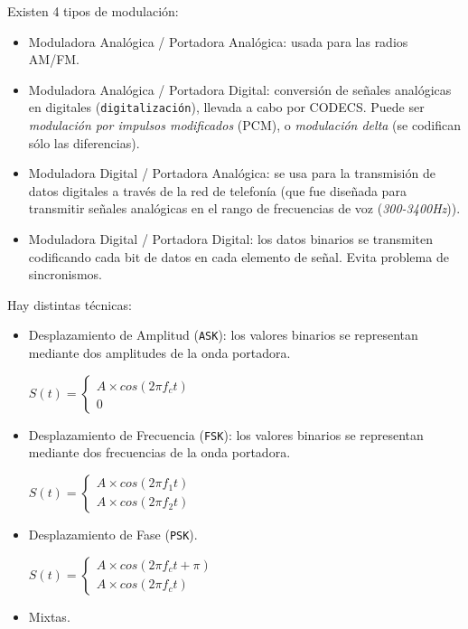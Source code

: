 \documentclass[]{article}
\begin{document}
Existen 4 tipos de modulación:
\begin{itemize}
    \item Moduladora Analógica / Portadora Analógica: usada para las radios AM/FM.
    \item Moduladora Analógica / Portadora Digital: conversión de señales analógicas en digitales (\texttt{digitalización}), llevada a cabo por CODECS. Puede ser \emph{modulación por impulsos modificados} (PCM), o \emph{modulación delta} (se codifican sólo las diferencias).
    \item Moduladora Digital / Portadora Analógica: se usa para la transmisión de datos digitales a través de la red de telefonía (que fue diseñada para transmitir señales analógicas en el rango de frecuencias de voz (\emph{300-3400Hz})).
    \item Moduladora Digital / Portadora Digital: los datos binarios se transmiten codificando cada bit de datos en cada elemento de señal. Evita problema de sincronismos.
\end{itemize}


Hay distintas técnicas:
\begin{itemize}
    \item Desplazamiento de Amplitud (\texttt{ASK}): los valores binarios se representan mediante dos amplitudes de la onda portadora.
    \begin{center}
        $S(t) = \begin{cases}
                    A\times cos(2\pi f_c t)\\
                    0
                \end{cases}$
    \end{center}


    \item Desplazamiento de Frecuencia (\texttt{FSK}): los valores binarios se representan mediante dos frecuencias de la onda portadora.
     \begin{center}
        $S(t) = \begin{cases}
                    A\times cos(2\pi f_1 t)\\
                    A\times cos(2\pi f_2 t)
                \end{cases}$
    \end{center}

    \item Desplazamiento de Fase (\texttt{PSK}).
    \begin{center}
        $S(t) = \begin{cases}
                    A\times cos(2\pi f_c t + \pi)\\
                    A\times cos(2\pi f_c t)
                \end{cases}$
    \end{center}
    \item Mixtas.
\end{itemize}
\end{document}
